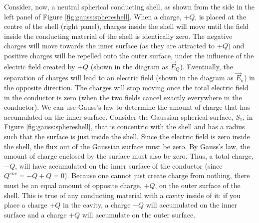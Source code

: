 Consider, now, a neutral spherical conducting shell, as shown from the side in the left panel of Figure \ref{fig:gauss:sphereshell}. When a charge, $+Q$, is placed at the centre of the shell (right panel), charges inside the shell will move until the field inside the conducting material of the shell is identically zero. The negative charges will move towards the inner surface (as they are attracted to $+Q$) and positive charges will be repelled onto the outer surface, under the influence of the electric field created by $+Q$ (shown in the diagram as $\vec E_{Q}$). Eventually, the separation of charges will lead to an electric field (shown in the diagram as $\vec E_{\sigma}$) in the opposite direction. The charges will stop moving once the total electric field in the conductor is zero (when the two fields cancel exactly everywhere in the conductor).
We can use Gauss's law to determine the amount of charge that has accumulated on the inner surface. Consider the Gaussian spherical surface, $S_1$, in Figure \ref{fig:gauss:sphereshell}, that is concentric with the shell and has a radius such that the surface is just inside the shell. Since the electric field is zero inside the shell, the flux out of the Gaussian surface must be zero. By Gauss's law, the amount of charge enclosed by the surface must also be zero. Thus, a total charge, $-Q$, will have accumulated on the inner surface of the conductor (since $Q^{enc}=-Q+Q=0$). Because one cannot just create charge from nothing, there must be an equal amount of opposite charge, $+Q$, on the outer surface of the shell. This is true of any conducting material with a cavity inside of it: if you place a charge $+Q$ in the cavity, a charge $-Q$ will accumulated on the inner surface and a charge $+Q$ will accumulate on the outer surface.

